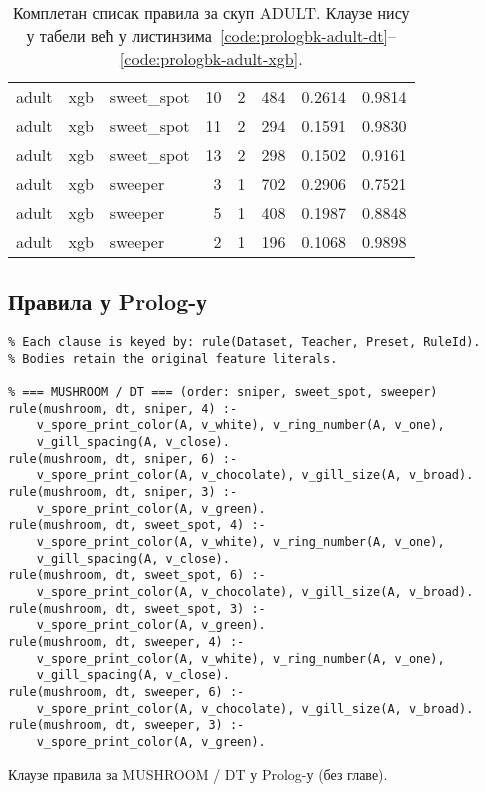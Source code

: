 \begin{appendices}
\begin{table}[H]
{\begin{tabular}{@{}lllrrrrr@{}}
adult    & xgb & sweet\_spot & 10 & 2 & 484 & 0.2614 & 0.9814 \\
adult    & xgb & sweet\_spot & 11 & 2 & 294 & 0.1591 & 0.9830 \\
adult    & xgb & sweet\_spot & 13 & 2 & 298 & 0.1502 & 0.9161 \\
adult    & xgb & sweeper     & 3  & 1 & 702 & 0.2906 & 0.7521 \\
adult    & xgb & sweeper     & 5  & 1 & 408 & 0.1987 & 0.8848 \\
adult    & xgb & sweeper     & 2  & 1 & 196 & 0.1068 & 0.9898 \\
\bottomrule
\end{tabular}%
}
\caption{Комплетан списак правила за скуп ADULT. Клаузе нису у табели већ у листинзима~\ref{code:prologbk-adult-dt}--\ref{code:prologbk-adult-xgb}.}
\label{tab:rules-adult}
\end{table}

\subsection{Правила у Prolog-у}




\begin{listing}[H]
\begin{verbatim}
% Each clause is keyed by: rule(Dataset, Teacher, Preset, RuleId).
% Bodies retain the original feature literals.

% === MUSHROOM / DT === (order: sniper, sweet_spot, sweeper)
rule(mushroom, dt, sniper, 4) :-
    v_spore_print_color(A, v_white), v_ring_number(A, v_one),
    v_gill_spacing(A, v_close).
rule(mushroom, dt, sniper, 6) :-
    v_spore_print_color(A, v_chocolate), v_gill_size(A, v_broad).
rule(mushroom, dt, sniper, 3) :-
    v_spore_print_color(A, v_green).
rule(mushroom, dt, sweet_spot, 4) :-
    v_spore_print_color(A, v_white), v_ring_number(A, v_one),
    v_gill_spacing(A, v_close).
rule(mushroom, dt, sweet_spot, 6) :-
    v_spore_print_color(A, v_chocolate), v_gill_size(A, v_broad).
rule(mushroom, dt, sweet_spot, 3) :-
    v_spore_print_color(A, v_green).
rule(mushroom, dt, sweeper, 4) :-
    v_spore_print_color(A, v_white), v_ring_number(A, v_one),
    v_gill_spacing(A, v_close).
rule(mushroom, dt, sweeper, 6) :-
    v_spore_print_color(A, v_chocolate), v_gill_size(A, v_broad).
rule(mushroom, dt, sweeper, 3) :-
    v_spore_print_color(A, v_green).
\end{verbatim}
\caption{Клаузе правила за MUSHROOM / DT у Prolog-у (без главе).}
\label{code:prologbk-mushroom-dt}
\end{listing}


\end{appendices}
